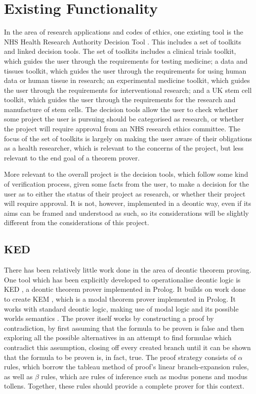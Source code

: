 \documentclass{l4proj}
\begin{document}
\section{Existing Functionality}
In the area of research applications and codes of ethics, one existing tool is the NHS Health Research Authority Decision Tool \cite{NHS}. This includes a set of toolkits and linked decision tools. The set of toolkits includes a clinical trials toolkit, which guides the user through the requirements for testing medicine; a data and tissues toolkit, which guides the user through  the requirements for using human data or human tissue in research; an experimental medicine toolkit, which guides the user through the requirements for interventional research; and a UK stem cell toolkit, which guides the user through the requirements for the research and manufacture of stem cells. The decision tools allow the user to check whether some project the user is pursuing should be categorised as research, or whether the project will require approval from an NHS research ethics committee. The focus of the set of toolkits is largely on making the user aware of their obligations as a health researcher, which is relevant to the concerns of the project, but less relevant to the end goal of a theorem prover. 

More relevant to the overall project is the decision tools, which follow some kind of verification process, given some facts from the user, to make a decision for the user as to either the status of their project as research, or whether their project will require approval. It is not, however, implemented in a deontic way, even if its aims can be framed and understood as such, so its considerations will be slightly different from the considerations of this project. 


\subsection{KED}
There has been relatively little work done in the area of deontic theorem proving. One tool which has been explicitly developed to operationalise deontic logic is KED \cite{KED}, a deontic theorem prover implemented in Prolog. It builds on work done to create KEM \cite{KEM}, which is a modal theorem prover implemented in Prolog. It works with standard deontic logic, making use of modal logic and its possible worlds semantics \cite{sep-possible-worlds}. The prover itself works by constructing a proof by contradiction, by first assuming that the formula to be proven is false and then exploring all the possible alternatives in an attempt to find formulae which contradict this assumption, closing off every created branch until it can be shown that the formula to be proven is, in fact, true. The proof strategy consists of $\alpha$ rules, which borrow the tableau method of proof's linear branch-expansion rules, as well as $\beta$ rules, which are rules of inference such as modus ponens and modus tollens. Together, these rules should provide a complete prover for this context. 
\end{document}
